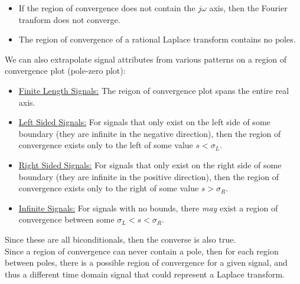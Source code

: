\documentclass{article}
\newcommand{\sheader}[1]{\underline{#1:}}
\newcommand{\gap}{\medskip\\}
\newcommand{\jomega}{{j\omega}}
\begin{document}
\begin{itemize}
    \item If the region of convergence does not contain the $\jomega$ axis, then the 
    Fourier tranform does not converge.
    \item The region of convergence of a rational Laplace transform contains no poles.
\end{itemize}
We can also extrapolate signal attributes from various patterns on a region of convergence plot
(pole-zero plot):
\begin{itemize}
    \item \sheader{Finite Length Signals} The reigon of convergence plot spans the 
    entire real axis.
    \item \sheader{Left Sided Signals} For signals that only exist on the left side of 
    some boundary (they are infinite in the negative direction), then the region of 
    convergence exists only to the left of some value $s < \sigma_L$.
    \item \sheader{Right Sided Signals} For signals that only exist on the right side 
    of some boundary (they are infinite in the positive direction), then the region of
    convergence exists only to the right of some value $s > \sigma_R$.
    \item \sheader{Infinite Signals} For signals with no bounds, there \textit{may} exist 
    a region of convergence between some $\sigma_L < s < \sigma_R$.
\end{itemize}
Since these are all biconditionals, then the converse is also true.
\gap
Since a region of convergence can never contain a pole, then for each region between 
poles, there is a possible region of convergence for a given signal, and thus a 
different time domain signal that could represent a Laplace transform.

\pagebreak
\end{document}
